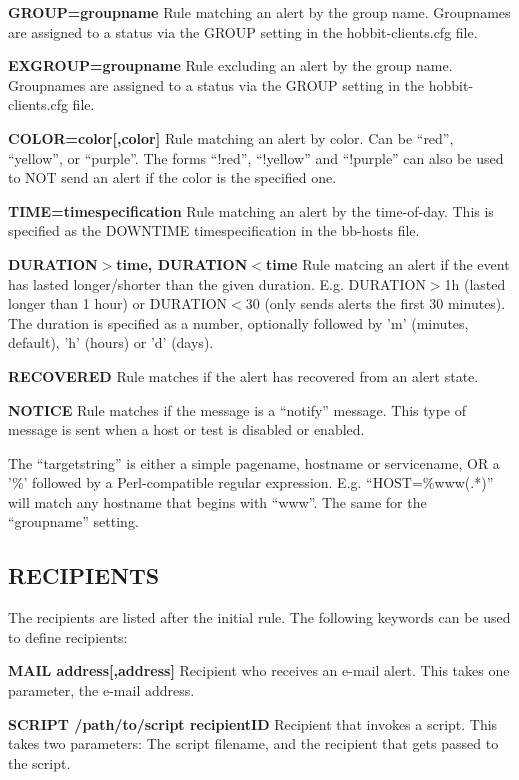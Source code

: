  \textbf{GROUP=groupname}
 Rule matching an alert by the group name. Groupnames are assigned to a status via the GROUP setting in the hobbit-clients.cfg file. 


 \textbf{EXGROUP=groupname}
 Rule excluding an alert by the group name. Groupnames are assigned to a status via the GROUP setting in the hobbit-clients.cfg file. 


 \textbf{COLOR=color[,color]}
 Rule matching an alert by color. Can be ``red'', ``yellow'', or ``purple''. The forms ``!red'', ``!yellow'' and ``!purple'' can also be used to NOT send an alert if the color is the specified one. 


 \textbf{TIME=timespecification}
 Rule matching an alert by the time-of-day. This is specified as the DOWNTIME timespecification in the bb-hosts file. 


 \textbf{DURATION$>$time, DURATION$<$time}
 Rule matcing an alert if the event has lasted longer/shorter than the given duration. E.g. DURATION$>$1h (lasted longer than 1 hour) or DURATION$<$30 (only sends alerts the first 30 minutes). The duration is specified as a number, optionally followed by 'm' (minutes, default), 'h' (hours) or 'd' (days). 


 \textbf{RECOVERED}
 Rule matches if the alert has recovered from an alert state. 


 \textbf{NOTICE}
 Rule matches if the message is a ``notify'' message. This type of message is sent when a host or test is disabled or enabled. 


  The ``targetstring'' is either a simple pagename, hostname or servicename, OR a '\%' followed by a Perl-compatible regular expression. E.g. ``HOST=\%www(.*)'' will match any hostname that begins with ``www''. The same for the ``groupname'' setting. 


 
\subsection{RECIPIENTS}
 The recipients are listed after the initial rule. The following keywords can be used to define recipients: 

 \textbf{MAIL address[,address]}
 Recipient who receives an e-mail alert. This takes one parameter, the e-mail address. 


 \textbf{SCRIPT /path/to/script recipientID}
 Recipient that invokes a script. This takes two parameters: The script filename, and the recipient that gets passed to the script. 


